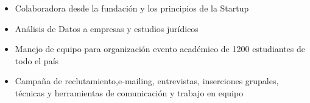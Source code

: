 \documentclass[10pt,a4paper,ragged2e,withhyper]{altacv}
\begin{document}
\begin{paracol}{2}


\begin{itemize}
\item Colaboradora desde la fundación y los principios de la Startup
\item Análisis de Datos a empresas y estudios jurídicos
\end{itemize}

\divider

\begin{itemize}
\item Manejo de equipo para organización evento académico de 1200 estudiantes de todo el país
\end{itemize}

\divider

\begin{itemize}
\item Campaña de reclutamiento,e-mailing, entrevistas, inserciones grupales, técnicas y herramientas de comunicación y trabajo en equipo 
\end{itemize}
\divider




\end{paracol}
\end{document}
